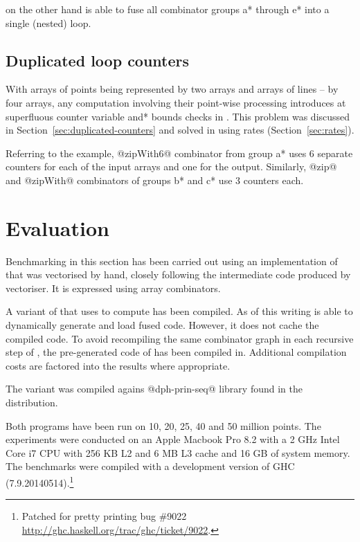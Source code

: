 \documentclass[preamble.tex]{subfiles}
\begin{document}
\LiveFusion on the other hand is able to fuse all combinator groups \*a* through \*e* into a single (nested) loop.


\subsection{Duplicated loop counters}

With arrays of points being represented by two arrays and arrays of lines -- by four arrays, any computation involving their point-wise processing introduces at superfluous counter variable \*and* bounds checks in \StreamFusion. This problem was discussed in Section~\ref{sec:duplicated-counters} and solved in \LiveFusion using rates (Section~\ref{sec:rates}).

Referring to the \FilterMax example, @zipWith6@ combinator from group \*a* uses 6 separate counters for each of the input arrays and one for the output. Similarly, @zip@ and @zipWith@ combinators of groups \*b* and \*c* use 3 counters each.



\section{Evaluation}

Benchmarking in this section has been carried out using an implementation of \QuickHull that was vectorised by hand, closely following the intermediate  code produced by \DPH vectoriser. It is expressed using array combinators.

A variant of \QuickHull that uses \LiveFusion to compute \FilterMax has been compiled. As of this writing \LiveFusion is able to dynamically generate and load fused code. However, it does not cache the compiled code. To avoid recompiling the same combinator graph in each recursive step of \QuickHull, the pre-generated code of \FilterMax has been compiled in. Additional compilation costs are factored into the results where appropriate.

The \StreamFusion variant was compiled agains @dph-prin-seq@ library found in the \DPH distribution.

Both programs have been run on 10, 20, 25, 40 and 50 million points. The experiments were conducted on an Apple Macbook Pro 8.2 with a 2 GHz Intel Core i7 CPU with 256 KB L2 and 6 MB L3 cache and 16 GB of system memory. The benchmarks were compiled with a development version of GHC (7.9.20140514).\footnote{Patched for  pretty printing bug \#9022 \url{http://ghc.haskell.org/trac/ghc/ticket/9022}.}
\end{document}
